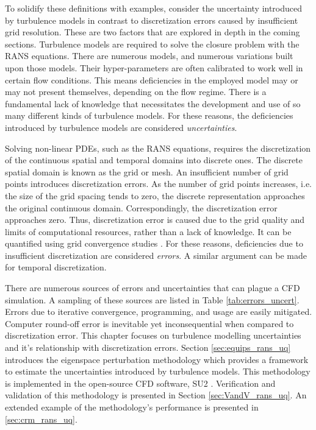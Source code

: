 To solidify these definitions with examples, consider the uncertainty introduced by turbulence models in contrast to discretization errors caused by insufficient grid resolution. These are two factors that are explored in depth in the coming sections. Turbulence models are required to solve the closure problem with the RANS equations. There are numerous models, and numerous variations built upon those models. Their hyper-parameters are often calibrated to work well in certain flow conditions. This means deficiencies in the employed model may or may not present themselves, depending on the flow regime. There is a fundamental lack of knowledge that necessitates the development and use of so many different kinds of turbulence models. For these reasons, the deficiencies introduced by turbulence models are considered \textit{uncertainties}.

Solving non-linear PDEs, such as the RANS equations, requires the discretization of the continuous spatial and temporal domains into discrete ones. The discrete spatial domain is known as the grid or mesh. An insufficient number of grid points introduces discretization errors. As the number of grid points increases, i.e. the size of the grid spacing tends to zero, the discrete representation approaches the original continuous domain. Correspondingly, the discretization error approaches zero. Thus, discretization error is caused due to the grid quality and limits of computational resources, rather than a lack of knowledge. It can be quantified using grid convergence studies \cite{american_society_of_mechanical_engineers_standard_2009}. For these reasons, deficiencies due to insufficient discretization are considered \textit{errors}. A similar argument can be made for temporal discretization.

There are numerous sources of errors and uncertainties that can plague a CFD simulation. A sampling of these sources are listed in Table \ref{tab:errors_uncert}. Errors due to iterative convergence, programming, and usage are easily mitigated. Computer round-off error is inevitable yet inconsequential when compared to discretization error. This chapter focuses on turbulence modelling uncertainties and it's relationship with discretization errors. Section \ref{sec:equips_rans_uq} introduces the eigenspace perturbation methodology which provides a framework to estimate the uncertainties introduced by turbulence models. This methodology is implemented in the open-source CFD software, SU2 \cite{su2_aiaajournal}. Verification and validation of this methodology is presented in Section \ref{sec:VandV_rans_uq}. An extended example of the methodology's performance is presented in \ref{sec:crm_rans_uq}. 

